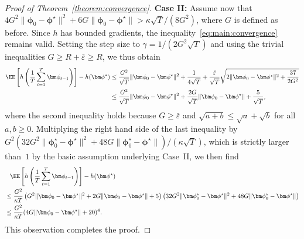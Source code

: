 \documentclass[11pt, a4paper, oneside, reqno]{article}
\begin{document}
\begin{proof} [Proof of Theorem~\ref{theorem:convergence}]
		\textbf{Case II:} Assume now that $4 G^2 \| \bm \phi_0 - \bm \phi^\star \|^2 + 6 G \| \bm \phi_0 - \bm \phi^\star \| > {\kappa \sqrt{T}}/{(8 G^2)}$, where $G$ is defined as before.
		Since $h$ has bounded gradients, the inequality~\eqref{eq:main:convergence} remains valid. Setting the step size to $\gamma = 1 / (2 G^2 \sqrt{T})$ and using the trivial inequalities $G \geq R + \bar \varepsilon \geq R$, we thus obtain
		\begin{align*}
			\EE \left[ h \left(\frac{1}{T} \sum_{t=1}^{T} \bm \phi_{t-1} \right) \right] - h(\bm \phi^\star)
			&\leq \frac{G^2}{\sqrt{T}} \| \bm \phi_0 - \bm \phi^\star \|^2 + \frac{1}{4\sqrt{T}} + \frac{\bar \varepsilon}{\sqrt{T}} \sqrt{2 \| \bm \phi_0 - \bm \phi^\star \|^2 + \frac{37}{2G^2}} \\
			&\leq \frac{G^2}{\sqrt{T}} \| \bm \phi_0 - \bm \phi^\star \|^2 + \frac{2G}{\sqrt{T}} \| \bm \phi_0 - \bm \phi^\star \| + \frac{5}{\sqrt{T}} ,
		\end{align*}
		where the second inequality holds because $G \geq \bar \varepsilon$ and $\sqrt{a + b} \leq \sqrt{a} + \sqrt{b}$ for all $a,b\ge 0$.
		Multiplying the right hand side of the last inequality by $G^2 (32 G^2 \| \bm \phi_0^\star - \bm \phi^\star \|^2 + 48 G \| \bm \phi_0^\star - \bm \phi^\star \|) / (\kappa \sqrt{T})$, which is strictly larger than~$1$ by the basic assumption underlying Case~II, we then find
		\begin{align*}
		    & \phantom{\leq} \EE \left[ h \left(\frac{1}{T} \sum_{t=1}^{T} \bm \phi_{t-1} \right) \right] - h(\bm \phi^\star) \\
		    &\leq \frac{G^2}{\kappa T}
		    \left( G^2 \| \bm \phi_0 - \bm \phi^\star \|^2 + 2 G \| \bm \phi_0 - \bm \phi^\star \| + 5 \right) \left( 32 G^2 \| \bm \phi_0^\star - \bm \phi^\star \|^2 +
		    48 G \| \bm \phi_0^\star - \bm \phi^\star \| \right) \\
		    &\leq \frac{G^2}{\kappa T} (4 G \| \bm \phi_0 - \bm \phi^\star \| + 20)^4.
		\end{align*}
		This observation completes the proof.
	\end{proof}
	
	
\end{document}
